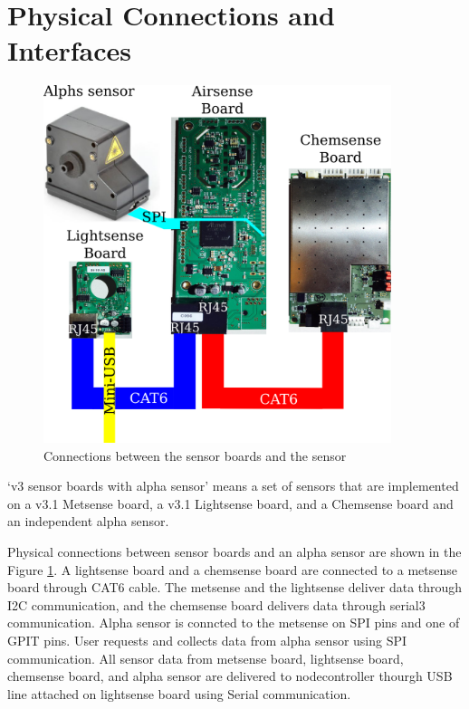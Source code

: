 \section{Physical Connections and Interfaces}

\begin{figure}[h]
\begin{center}
\includegraphics[width=4in]{physicalConnections.png}
\caption{Connections between the sensor boards and the sensor}
\label{fig:a}
\end{center}
\end{figure}


`v3 sensor boards with alpha sensor' means a set of sensors that are implemented on a v3.1 Metsense board, a v3.1 Lightsense board, and a Chemsense board and an independent alpha sensor.
\par
Physical connections between sensor boards and an alpha sensor are shown in the Figure \ref{fig:a}. A lightsense board and a chemsense board are connected to a metsense board through CAT6 cable. The metsense and the lightsense deliver data through I2C communication, and the chemsense board delivers data through serial3 communication. Alpha sensor is conncted to the metsense on SPI pins and one of GPIT pins. User requests and collects data from alpha sensor using SPI communication. All sensor data from metsense board, lightsense board, chemsense board, and alpha sensor are delivered to nodecontroller thourgh USB line attached on lightsense board using Serial communication. 
